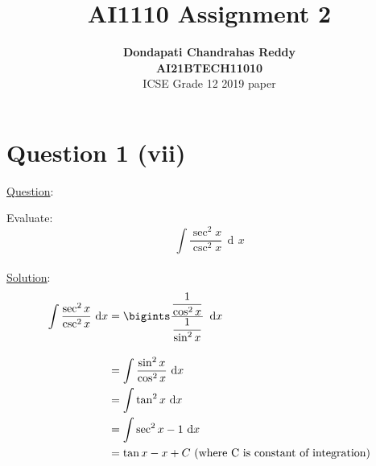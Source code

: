 \documentclass[journal,12pt,twocolumn]{IEEEtran}
\DeclareMathOperator{\di}{d\!}
\begin{document}
\title{\textbf{AI1110 Assignment 2} }
\author{\textbf{Dondapati Chandrahas Reddy}\\\textbf{AI21BTECH11010}\\ ICSE Grade 12 2019 paper}
\maketitle

{\section{Question 1 (vii)\newline}}

{\large \underline{Question}:\newline}

Evaluate:
\begin{equation}
	\int \dfrac{\sec^2 x}{\csc^2 x} \,\di x 
\end{equation}\\

{\large \underline{Solution}:}\\

\begin{align}
	\int \dfrac{\sec^2 x}{\csc^2 x} \,\di x &= \bigints \dfrac{\dfrac{1}{\cos^2 x}}{\dfrac{1}{\sin^2 x}} \,\,\di x \\[1em]
	&= \int \dfrac{\sin^2 x}{\cos^2 x} \, \di x \\
	&= \int \tan^2 x \,\di x \\
	&= \int \sec^2 x-1 \,\di x \\
	&= \tan x - x + C \text{ (where C is constant of integration)}
\end{align}
\end{document}
